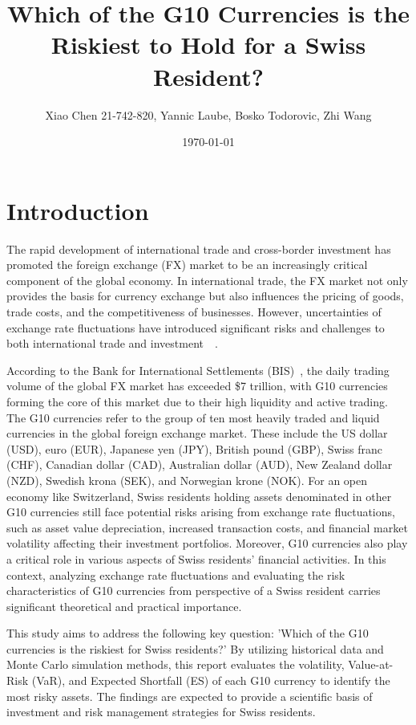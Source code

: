 \documentclass{article}
\title{\textbf{Which of the G10 Currencies is the Riskiest to Hold for a Swiss Resident?}}
\author{Xiao Chen 21-742-820, Yannic Laube, Bosko Todorovic, Zhi Wang}
\date{\today}
\begin{document}
\maketitle
\section{Introduction}
The rapid development of international trade and cross-border investment has promoted the foreign exchange (FX) market to be an increasingly critical component of the global economy. In international trade, the FX market not only provides the basis for currency exchange but also influences the pricing of goods, trade costs, and the competitiveness of businesses. However, uncertainties of exchange rate fluctuations have introduced significant risks and challenges to both international trade and investment~\cite{AUBOIN_RUTA_2013}~\cite{riker2020review}.

According to the Bank for International Settlements (BIS)~\cite{bis2022report}, the daily trading volume of the global FX market has exceeded \$7 trillion, with G10 currencies forming the core of this market due to their high liquidity and active trading. The G10 currencies refer to the group of ten most heavily traded and liquid currencies in the global foreign exchange market. These include the US dollar (USD), euro (EUR), Japanese yen (JPY), British pound (GBP), Swiss franc (CHF), Canadian dollar (CAD), Australian dollar (AUD), New Zealand dollar (NZD), Swedish krona (SEK), and Norwegian krone (NOK). For an open economy like Switzerland, Swiss residents holding assets denominated in other G10 currencies still face potential risks arising from exchange rate fluctuations, such as asset value depreciation, increased transaction costs, and financial market volatility affecting their investment portfolios. Moreover, G10 currencies also play a critical role in various aspects of Swiss residents' financial activities. In this context, analyzing exchange rate fluctuations and evaluating the risk characteristics of G10 currencies from perspective of a Swiss resident carries significant theoretical and practical importance.

This study aims to address the following key question: 'Which of the G10 currencies is the riskiest for Swiss residents?' By utilizing historical data and Monte Carlo simulation methods, this report evaluates the volatility, Value-at-Risk (VaR), and Expected Shortfall (ES) of each G10 currency to identify the most risky assets. The findings are expected to provide a scientific basis of investment and risk management strategies for Swiss residents.
\end{document}
